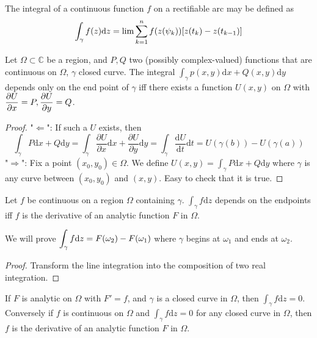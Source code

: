 The integral of a continuous function  $ f $ on a rectifiable arc may be defined as 
\[\displaystyle\int_\gamma f(z)\mathrm{d}z=\lim \sum_{k=1}^nf(z(\psi_k))[z(t_k)-z(t_{k-1})]\] 
\begin{theorem}
    Let  $ \Omega\subset \mathbb{C} $ be a region, and  $ P,Q $ two (possibly complex-valued) functions that are continuous on  $ \Omega $,  $ \gamma $ closed curve. The integral  $ \int_\gamma p(x,y)\mathrm{d}x+Q(x,y)\mathrm{d}y $ depends only on the end point of  $ \gamma $ iff there exists a function   $ U(x,y) $ on  $ \Omega $ with  $ \displaystyle\frac{\partial U}{\partial x}=P,\frac{\partial U}{\partial y}=Q $.  
\end{theorem}
\begin{proof}
    "$ \Leftarrow $": If such a  $ U $ exists, then 
    \[\int_\gamma P\mathrm{d}x+Q\mathrm{d}y=\int_\gamma\frac{\partial U}{\partial x}\mathrm{d}x+\frac{\partial U}{\partial y}\mathrm{d}y=\int_\gamma\frac{\mathrm{d}U}{\mathrm{d}t}\mathrm{d}t=U(\gamma(b))-U(\gamma(a))\] 
    "$ \Rightarrow $": Fix a point  $ (x_0,y_0)\in \Omega $. We define  $ U(x,y)=\int_\gamma P\mathrm{d}x+Q\mathrm{d}y$ where  $ \gamma $ is any curve between  $ (x_0,y_0) $ and  $ (x,y) $. Easy to check that it is true.     
\end{proof}
\begin{theorem}\label{Fundamental theorem of Calculus for integrals}
    Let  $ f $ be continuous on a region  $ \Omega $  containing  $ \gamma $.  $ \int_\gamma f\mathrm{d}z $ depends on the endpoints iff  $ f $ is the derivative of an analytic function  $ F $ in  $ \Omega $.     
\end{theorem}
\begin{remark}
    We will prove  $ \displaystyle\int_\gamma f\mathrm{d}z=F(\omega_2)-F(\omega_1) $ where  $ \gamma $ begins at  $ \omega_1 $ and ends at  $ \omega_2 $.    
\end{remark}
\begin{proof}
    Transform  the line integration into  the composition of two real integration.
\end{proof}
\begin{corollary}\label{Corollary of Fundamental Theorem}
    If  $ F $ is analytic on  $ \Omega $ with  $ F'=f $, and  $ \gamma $ is a closed curve in  $\Omega $, then  $ \int_\gamma f\mathrm{d}z=0 $. Conversely if  $ f $  is continuous on  $ \Omega $ and  $ \int_\gamma f\mathrm{d}z=0 $ for any closed curve in  $ \Omega $, then  $ f $ is the derivative of an analytic function  $ F $ in  $\Omega $.          
\end{corollary}

